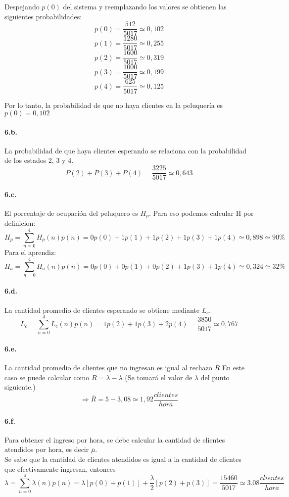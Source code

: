 \documentclass{article}
\begin{document}
    Despejando $p(0)$ del sistema y reemplazando los valores se obtienen las siguientes probabilidades:
    $$ p(0) = \frac{512}{5017} \simeq 0,102$$
    $$ p(1) = \frac{1280}{5017} \simeq 0,255$$
    $$ p(2) = \frac{1600}{5017} \simeq 0,319$$
    $$ p(3) = \frac{1000}{5017}\simeq 0,199$$
    $$ p(4) = \frac{625}{5017} \simeq 0,125$$
    
    Por lo tanto, la probabilidad de que no haya clientes en la peluquería es $p(0) = 0,102$
       
    
    \paragraph{6.b.} La probabilidad de que haya clientes esperando se relaciona con la probabilidad de los estados 2, 3 y 4. \\
    $$P(2) + P(3) + P(4) = \frac{3225}{5017} \simeq 0,643$$
    
    \paragraph{6.c.} El porcentaje de ocupación del peluquero es $H_p$. Para eso podemos calcular H por definicion:
    $$H_p = \sum_{n=0}^{4}H_p(n) p(n) = 0 p(0) + 1 p(1) + 1 p(2) + 1 p(3) + 1 p(4) \simeq 0,898 \simeq 90\% $$
    Para el aprendiz:
    $$H_a = \sum_{n=0}^{4}H_a(n) p(n) = 0 p(0) + 0 p(1) + 0 p(2) + 1 p(3) + 1 p(4) \simeq 0,324 \simeq 32\% $$
    
    \paragraph{6.d.} La cantidad promedio de clientes esperando se obtiene mediante $L_c$.
    $$L_c = \sum_{n=0}^{4}L_c(n) p(n) =1 p(2) + 1 p(3) + 2 p(4) = \frac{3850}{5017} \simeq 0,767$$
    
    
    \paragraph{6.e.} La cantidad promedio de clientes que no ingresan es igual al rechazo  $ \overline{R}$
    En este caso se puede calcular como $ \overline{R} = \lambda - \overline{\lambda}$ (Se tomará el valor de $\overline{\lambda}$ del punto siguiente.)
    $$ \Rightarrow \overline{R} = 5 - 3,08 \simeq 1,92 \frac{clientes}{hora}$$
    
    
    \paragraph{6.f.} Para obtener el ingreso por hora, se debe calcular la cantidad de clientes atendidos por hora, es decir $\overline{\mu}$.\\
    Se sabe que la cantidad de clientes atendidos es igual a la cantidad de clientes que efectivamente ingresan, entonces \\
    $$ \overline{\lambda} = \sum_{n=0}^{4}\lambda(n) p(n) = \lambda [ p(0)+p(1)] + \frac{\lambda}{2} [p(2) + p(3)] = \frac{15460}{5017} \simeq 3.08 \frac{clientes}{hora}$$
 
\end{document}
